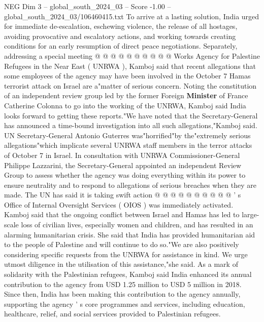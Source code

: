 \begin{textsample}{NEG Dim 3 – global\_south\_2024\_03 – Score -1.00 – global\_south\_2024\_03/106460415.txt}
To arrive at a lasting solution, India urged for immediate de-escalation, eschewing violence, the release of all hostages, avoiding provocative and escalatory actions, and working towards creating conditions for an early resumption of direct peace negotiations.
Separately, addressing a special meeting @ @ @ @ @ @ @ @ @ @ Works Agency for Palestine Refugees in the Near East ( UNRWA ), Kamboj said that recent allegations that some employees of the agency may have been involved in the October 7 Hamas terrorist attack on Israel are a"matter of serious concern.
Noting the constitution of an independent review group led by the former Foreign \textbf{Minister} of France Catherine Colonna to go into the working of the UNRWA, Kamboj said India looks forward to getting these reports."We have noted that the Secretary-General has announced a time-bound investigation into all such allegations,"Kamboj said.
UN Secretary-General Antonio Guterres was"horrified"by the"extremely serious allegations"which implicate several UNRWA staff members in the terror attacks of October 7 in Israel.
In consultation with UNRWA Commissioner-General Philippe Lazzarini, the Secretary-General appointed an independent Review Group to assess whether the agency was doing everything within its power to ensure neutrality and to respond to allegations of serious breaches when they are made.
The UN has said it is taking swift action @ @ @ @ @ @ @ @ @ @ ' s Office of Internal Oversight Services ( OIOS ) was immediately activated.
Kamboj said that the ongoing conflict between Israel and Hamas has led to large-scale loss of civilian lives, especially women and children, and has resulted in an alarming humanitarian crisis.
She said that India has provided humanitarian aid to the people of Palestine and will continue to do so."We are also positively considering specific requests from the UNRWA for assistance in kind.
We urge utmost diligence in the utilisation of this assistance,"she said.
As a mark of solidarity with the Palestinian refugees, Kamboj said India enhanced its annual contribution to the agency from USD 1.25 million to USD 5 million in 2018.
Since then, India has been making this contribution to the agency annually, supporting the agency ' s core programmes and services, including education, healthcare, relief, and social services provided to Palestinian refugees.

\end{textsample}
